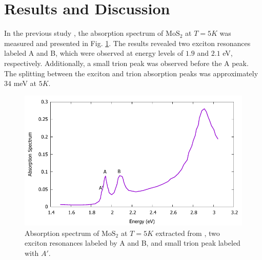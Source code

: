 \documentclass[12pt,english,a4paper]{article}
\begin{document}

\newpage
\section{Results and Discussion}
\quad In the previous study \cite{zhang_absorption_2014}, the absorption spectrum of $\mathrm{MoS}_2$ at $T = 5K$ was measured and presented in Fig. \ref{Absorpt Ex.}. The results revealed two exciton resonances labeled A and B, which were observed at energy levels of $1.9$ and $2.1$ eV, respectively. Additionally, a small trion peak was observed before the A peak. The splitting between the exciton and trion absorption peaks was approximately $34$ meV at $5K$.\\
\begin{figure}
	\begin{center}
		\includegraphics[width=0.75\linewidth]{images/experiment.pdf}
		\caption[Absorption spectrum of $\mathrm{MoS}_2$]{Absorption spectrum of $\mathrm{MoS}_2$ at $T=5K$  extracted from \cite{zhang_absorption_2014}, two exciton resonances labeled by A and B, and small trion peak labeled with $A'$.}
		\label{Absorpt Ex.}
	\end{center}
\end{figure}\null
\end{document}
